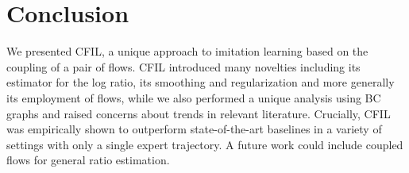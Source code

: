 \section{Conclusion}
We presented CFIL, a unique approach to imitation learning based on the coupling of a pair of flows. CFIL introduced many novelties including its estimator for the log ratio, its smoothing and regularization and more generally its employment of flows, while we also performed a unique analysis using BC graphs and raised concerns about trends in relevant literature. Crucially, CFIL was empirically shown to outperform state-of-the-art baselines in a variety of settings with only a single expert trajectory. A future work could include coupled flows for general ratio estimation.
